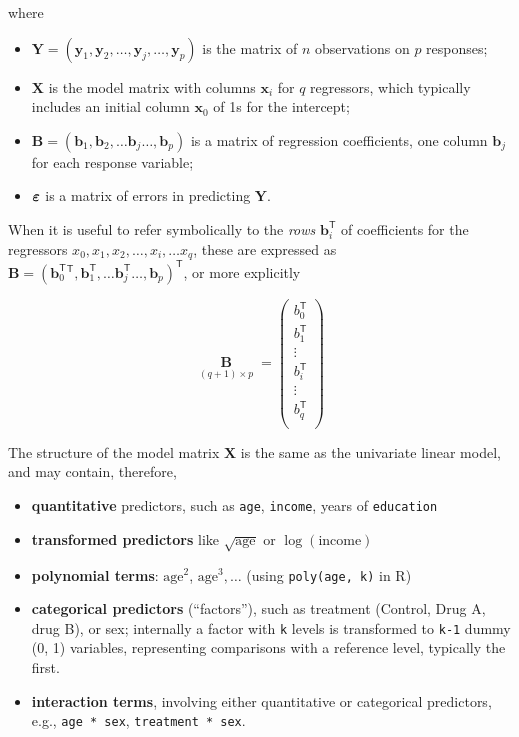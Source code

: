 \documentclass[
  letterpaper,
  10pt,
  krantz2]{krantz}
\providecommand{\tightlist}{%
  \setlength{\itemsep}{0pt}\setlength{\parskip}{0pt}}\usepackage{longtable,booktabs,array}
\begin{document}
where

\begin{itemize}
\tightlist
\item
  \(\mathbf{Y} = (\mathbf{y}_1 , \mathbf{y}_2, \dots , \mathbf{y}_j, \dots, \mathbf{y}_p )\)
  is the matrix of \(n\) observations on \(p\) responses;
\item
  \(\mathbf{X}\) is the model matrix with columns \(\mathbf{x}_i\) for
  \(q\) regressors, which typically includes an initial column
  \(\mathbf{x}_0\) of 1s for the intercept;
\item
  \(\mathbf{B} = ( \mathbf{b}_1 , \mathbf{b}_2 , \dots \mathbf{b}_j \dots, \mathbf{b}_p )\)
  is a matrix of regression coefficients, one column \(\mathbf{b}_j\)
  for each response variable;
\item
  \(\boldsymbol{\Large\varepsilon}\) is a matrix of errors in predicting
  \(\mathbf{Y}\).
\end{itemize}

When it is useful to refer symbolically to the \emph{rows}
\(\mathbf{b}_i^\mathsf{T}\) of coefficients for the regressors
\(x_0, x_1, x_2, \dots, x_i, \dots x_q\), these are expressed as
\(\mathbf{B} = ( \mathbf{b}_0^\mathsf{T}^\mathsf{T} , \mathbf{b}_1^\mathsf{T} , \dots \mathbf{b}_j^\mathsf{T} \dots, \mathbf{b}_p )^\mathsf{T}\),
or more explicitly

\[
\mathord{\mathop{\mathbf{B}}\limits_{(q+1) \times p}} =
\begin{pmatrix} 
  b_{0}^\mathsf{T} \\ 
  b_{1}^\mathsf{T}  \\ 
  \vdots \\
  b_{i}^\mathsf{T}  \\
  \vdots \\
  b_{q}^\mathsf{T}  \\ 
\end{pmatrix}
\]

The structure of the model matrix \(\mathbf{X}\) is the same as the
univariate linear model, and may contain, therefore,

\begin{itemize}
\tightlist
\item
  \textbf{quantitative} predictors, such as \texttt{age},
  \texttt{income}, years of \texttt{education}
\item
  \textbf{transformed predictors} like \(\sqrt{\text{age}}\) or
  \(\log{(\text{income})}\)
\item
  \textbf{polynomial terms}: \(\text{age}^2\), \(\text{age}^3, \dots\)
  (using \texttt{poly(age,\ k)} in R)
\item
  \textbf{categorical predictors} (``factors''), such as treatment
  (Control, Drug A, drug B), or sex; internally a factor with \texttt{k}
  levels is transformed to \texttt{k-1} dummy (0, 1) variables,
  representing comparisons with a reference level, typically the first.
\item
  \textbf{interaction terms}, involving either quantitative or
  categorical predictors, e.g., \texttt{age\ *\ sex},
  \texttt{treatment\ *\ sex}.
\end{itemize}
\end{document}
